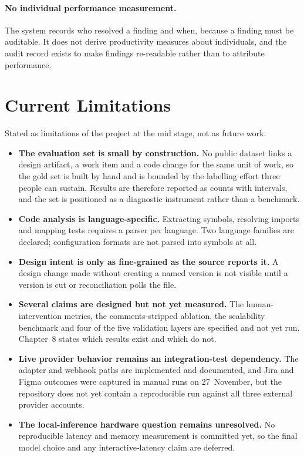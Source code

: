 \paragraph{No individual performance measurement.} The system records who
resolved a finding and when, because a finding must be auditable. It does not
derive productivity measures about individuals, and the audit record exists to
make findings re-readable rather than to attribute performance.

\section{Current Limitations}

Stated as limitations of the project at the mid stage, not as future work.

\begin{itemize}
  \item \textbf{The evaluation set is small by construction.} No public dataset
        links a design artifact, a work item and a code change for the same
        unit of work, so the gold set is built by hand and is bounded by the
        labelling effort three people can sustain. Results are therefore
        reported as counts with intervals, and the set is positioned as a
        diagnostic instrument rather than a benchmark.
  \item \textbf{Code analysis is language-specific.} Extracting symbols,
        resolving imports and mapping tests requires a parser per language.
        Two language families are declared; configuration formats are not
        parsed into symbols at all.
  \item \textbf{Design intent is only as fine-grained as the source reports
        it.} A design change made without creating a named version is not
        visible until a version is cut or reconciliation polls the file.
  \item \textbf{Several claims are designed but not yet measured.} The
        human-intervention metrics, the comments-stripped ablation, the
        scalability benchmark and four of the five validation layers are
        specified and not yet run. Chapter~8 states which results exist and
        which do not.
  \item \textbf{Live provider behavior remains an integration-test
        dependency.} The adapter and webhook paths are implemented and
        documented, and Jira and Figma outcomes were captured in manual runs on
        27~November, but the repository does not yet contain a reproducible run
        against all three external provider accounts.
  \item \textbf{The local-inference hardware question remains unresolved.}
        No reproducible latency and memory measurement is committed yet, so
        the final model choice and any interactive-latency claim are deferred.
\end{itemize}
